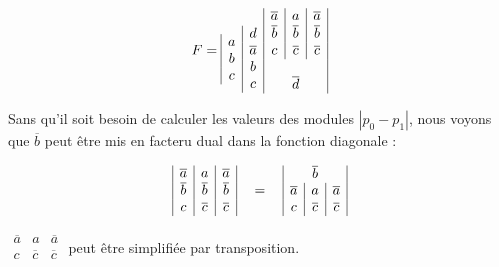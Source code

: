 \[ F= 
\begin{array}{|c} \multicolumn{1}{c}{}\\  a \\ b \\ c\\ \end{array} \begin{array}{|c}  \multicolumn{1}{c}{} \\   d \\ \overline{a} \\ b \\ c \\ \end{array} \begin{array}{|c|c|c|}  \overline{a} & a &  \overline{a} \\
      \overline{b} & \overline{b} & \overline{b} \\
      c & \overline{c} & \overline{c} \\     \multicolumn{3}{|c|}{\overline{}}\\
      \multicolumn{3}{|c|}{\overline{d}}\\
      \end{array}   
\]

\medskip 

Sans qu'il soit besoin de calculer les valeurs des modules $| p_0 - p_1|$, nous voyons que $\overline{b}$ peut être mis en facteru dual dans la fonction diagonale : 

\medskip


\[
 \begin{array}{|c|c|c|} \overline{a} & a & \overline{a} \\
                       \overline{b} &  \overline{b} &  \overline{b} \\
                      c            &  \overline{c} &  \overline{c}  \\    
\end{array}   \quad = \quad  
        \begin{array}{|c|c|c|} 
                             \multicolumn{3}{|c|}{\overline{b}} \\
                              \overline{a} & a & \overline{a} \\
                                   c    & \overline{c} & \overline{c} \\
       \end{array}        
\]

\medskip 

$\begin{array}{|c|c|c|} 
	\overline{a} & a & \overline{a} \\
	c & \overline{c} & \overline{c} \\
\end{array} $ peut être simplifiée par transposition. 

